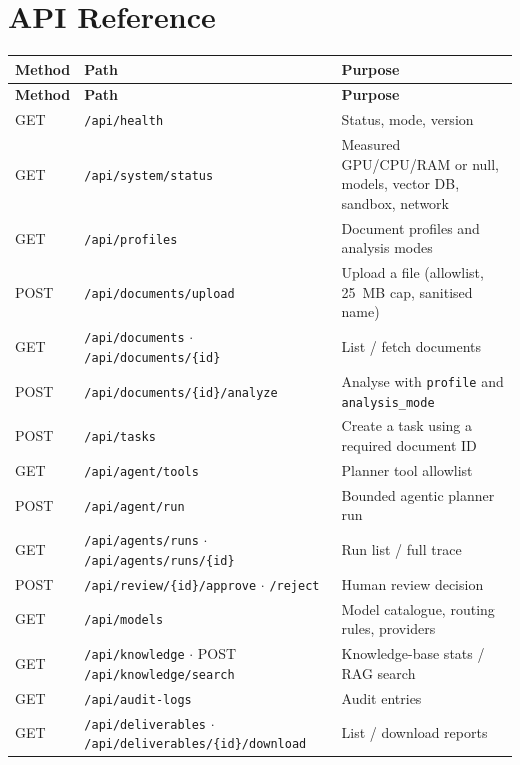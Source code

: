 \documentclass[11pt,a4paper]{article}
\begin{document}
\appendix
\section{API Reference}
\begin{longtable}{@{}p{1.6cm} p{6.4cm} p{6.4cm}@{}}
\toprule
\textbf{Method} & \textbf{Path} & \textbf{Purpose} \\
\midrule
\endfirsthead
\toprule
\textbf{Method} & \textbf{Path} & \textbf{Purpose} \\
\midrule
\endhead
GET & \texttt{/api/health} & Status, mode, version \\
GET & \texttt{/api/system/status} & Measured GPU/CPU/RAM or null, models, vector DB, sandbox, network \\
GET & \texttt{/api/profiles} & Document profiles and analysis modes \\
POST & \texttt{/api/documents/upload} & Upload a file (allowlist, 25~MB cap, sanitised name) \\
GET & \texttt{/api/documents} $\cdot$ \texttt{/api/documents/\{id\}} & List / fetch documents \\
POST & \texttt{/api/documents/\{id\}/analyze} & Analyse with \texttt{profile} and \texttt{analysis\_mode} \\
POST & \texttt{/api/tasks} & Create a task using a required document ID \\
GET & \texttt{/api/agent/tools} & Planner tool allowlist \\
POST & \texttt{/api/agent/run} & Bounded agentic planner run \\
GET & \texttt{/api/agents/runs} $\cdot$ \texttt{/api/agents/runs/\{id\}} & Run list / full trace \\
POST & \texttt{/api/review/\{id\}/approve} $\cdot$ \texttt{/reject} & Human review decision \\
GET & \texttt{/api/models} & Model catalogue, routing rules, providers \\
GET & \texttt{/api/knowledge} $\cdot$ POST \texttt{/api/knowledge/search} & Knowledge-base stats / RAG search \\
GET & \texttt{/api/audit-logs} & Audit entries \\
GET & \texttt{/api/deliverables} $\cdot$ \texttt{/api/deliverables/\{id\}/download} & List / download reports \\
\bottomrule
\end{longtable}
\end{document}
